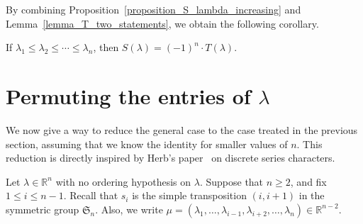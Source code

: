\documentclass[ALCO,ThmDefs,Unicode,epreuves]{cedram}
\newcommand{\Rrr}{\mathbb{R}}
\newcommand{\Sym}{\mathfrak{S}}
\newcommand{\R}{\Rrr}
\begin{document}
By combining
Proposition~\ref{proposition_S_lambda_increasing}
and
Lemma~\ref{lemma_T_two_statements},
we obtain the following corollary.
\begin{coro} 
If $\lambda_{1} \leq \lambda_{2} \leq \cdots \leq \lambda_{n}$, then
$S(\lambda)=(-1)^{n} \cdot  T(\lambda)$.
\label{corollary_base_case}
\end{coro}







\section{Permuting the entries of \texorpdfstring{$\lambda$}{lambda}}
\label{section_permute}

We now give a way to reduce the general case to the case treated
in the previous section,
assuming that we know the identity for smaller values of $n$.
This reduction is
directly inspired by Herb's paper~\cite{Herb} 
on discrete series characters. 

Let $\lambda \in \Rrr^{n}$
with no ordering hypothesis on $\lambda$.
Suppose that $n \geq 2$, and fix $1 \leq i \leq n-1$.
Recall that $s_{i}$ is the simple transposition $(i,i+1)$
in the symmetric group $\Sym_{n}$.
Also, we write
$\mu=(\lambda_{1},\ldots,\lambda_{i-1},\lambda_{i+2},\ldots,\lambda_{n})\in\R^{n-2}$.
\end{document}
